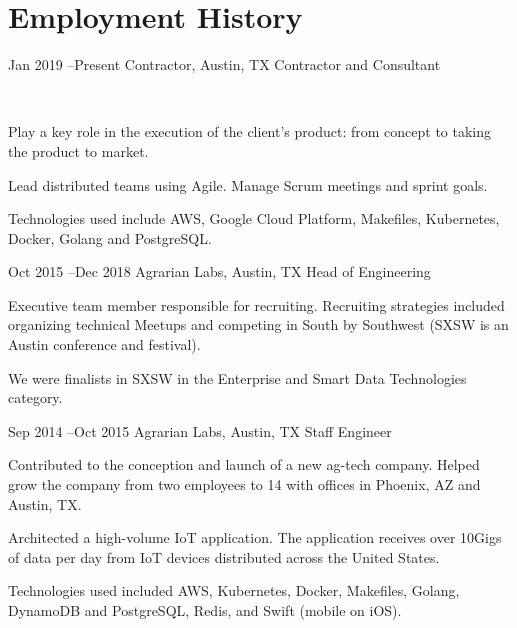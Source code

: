 \documentclass[10pt]{article} %
\begin{document}

\section{Employment History}

\job
{Jan 2019 --}{Present}
{Contractor, Austin, TX}
{}
{Contractor and Consultant}
{\\

\begin{itemize-noindent}
\item{Play a key role in the execution of the client's product: from concept to taking the product to market.}
\item{Lead distributed teams using Agile. Manage Scrum meetings and sprint goals.}
\item{Technologies used include AWS, Google Cloud Platform, Makefiles, Kubernetes, Docker, Golang and PostgreSQL.}
\end{itemize-noindent}
}


\job
{Oct 2015 --}{Dec 2018}
{Agrarian Labs, Austin, TX}
{}
{Head of Engineering}
{

\begin{itemize-noindent}
\item{Executive team member responsible for recruiting. Recruiting strategies included organizing technical Meetups and competing in South by Southwest (SXSW is an Austin conference and festival).}
\item{We were finalists in SXSW in the Enterprise and Smart Data Technologies category.}
\end{itemize-noindent}
}



\job
{Sep 2014 --}{Oct 2015}
{Agrarian Labs, Austin, TX}
{}
{Staff Engineer}
{

\begin{itemize-noindent}
\item{Contributed to the conception and launch of a new ag-tech company.  Helped grow the company from two employees to 14 with offices in Phoenix, AZ and Austin, TX.}
\item{Architected a high-volume IoT application.  The application receives over 10Gigs of data per day from IoT devices distributed across the United States.}
\item{Technologies used included AWS, Kubernetes, Docker, Makefiles, Golang, DynamoDB and PostgreSQL, Redis, and Swift (mobile on iOS).}
\end{itemize-noindent}
}
\end{document}
